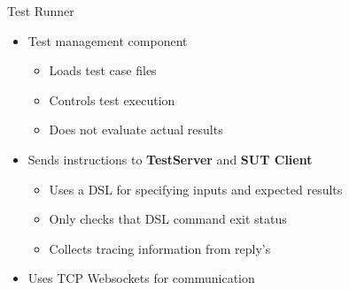 \documentclass[showdate=true, slidenumbers=slide]{beamerruhuisstijl169}
\begin{document}
\begin{frame}{Test Runner}
    \begin{itemize}
        \item Test management component
        \begin{itemize}
            \item Loads test case files
            \item Controls test execution
            \item Does not evaluate actual results
        \end{itemize}
        \item Sends instructions to \textbf{TestServer} and \textbf{SUT Client}
        \begin{itemize}
            \item Uses a DSL for specifying inputs and expected results
            \item Only checks that DSL command exit status
            \item Collects tracing information from reply's
        \end{itemize}
        \item Uses TCP Websockets for communication
    \end{itemize}
\end{frame}
\end{document}
